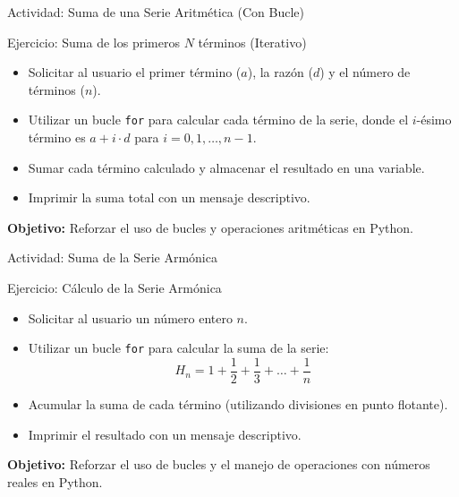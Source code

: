 \documentclass[10pt]{beamer}
\begin{document}
\begin{frame}[fragile]{Actividad: Suma de una Serie Aritmética (Con Bucle)} 
    \begin{block}{Ejercicio: Suma de los primeros $N$ términos (Iterativo)} 
        \begin{itemize} 
            \item Solicitar al usuario el primer término ($a$), la razón ($d$) y el número de términos ($n$). 
            \item Utilizar un bucle \texttt{for} para calcular cada término de la serie, donde el $i$-ésimo término es $a+i⋅d$ para    $i=0,1,\ldots,n−1$. 
            \item Sumar cada término calculado y almacenar el resultado en una variable. 
            \item Imprimir la suma total con un mensaje descriptivo. 
        \end{itemize} 
    \end{block} 
    \vspace{0.2cm} 
    \textbf{Objetivo:} Reforzar el uso de bucles y operaciones aritméticas en Python. 
\end{frame}
    
\begin{frame}[fragile]{Actividad: Suma de la Serie Armónica} 
    \begin{block}{Ejercicio: Cálculo de la Serie Armónica} 
        \begin{itemize} 
            \item Solicitar al usuario un número entero $n$. 
            \item Utilizar un bucle \texttt{for} para calcular la suma de la serie: 
            $$H_n = 1 + \frac{1}{2} + \frac{1}{3} + \ldots + \frac{1}{n}$$
            \item Acumular la suma de cada término (utilizando divisiones en punto flotante). 
            \item Imprimir el resultado con un mensaje descriptivo. 
        \end{itemize} 
    \end{block} 
    \vspace{0.2cm} 
    \textbf{Objetivo:} Reforzar el uso de bucles y el manejo de operaciones con números reales en Python.
\end{frame}
\end{document}
